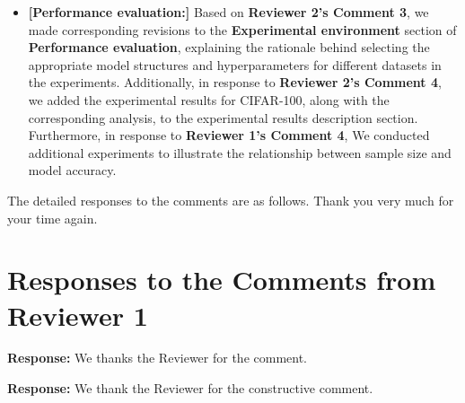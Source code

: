 \documentclass[a4paper,twoside,11pt,dvipsnames]{reviewresponse}
\begin{document}
\begin{itemize}
\item \textbf{[Performance evaluation:]} Based on \textbf{Reviewer 2's Comment 3}, we made corresponding revisions to the \textbf{Experimental environment} section of \textbf{Performance evaluation}, explaining the rationale behind selecting the appropriate model structures and hyperparameters for different datasets in the experiments. Additionally, in response to \textbf{Reviewer 2's Comment 4}, we added the experimental results for CIFAR-100, along with the corresponding analysis, to the experimental results description section. Furthermore, in response to \textbf{Reviewer 1's Comment 4}, We conducted additional experiments to illustrate the relationship between sample size and model accuracy.

\end{itemize}

\color{black}
The detailed responses to the comments are as follows. Thank you very much for your time again.

\newpage

\section{Responses to the Comments from Reviewer 1}
\textbf{Response:} 
We thanks the Reviewer for the comment.





\textbf{Response:} We thank the Reviewer for the constructive comment.  
\end{document}
